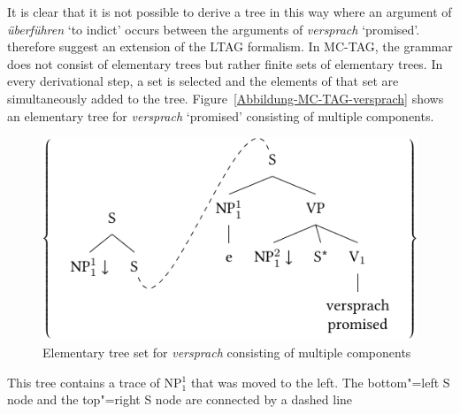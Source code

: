 \largerpage
It is clear that it is not possible to derive a tree in this way where an argument of \emph{überführen} `to indict' occurs between the arguments of \emph{versprach}
`promised'. \citet*{JBR2000a} therefore suggest an extension of the LTAG formalism. In MC-TAG, the grammar does not consist of elementary trees but rather
finite sets of elementary trees. In every derivational step, a set is selected and the elements of that set are simultaneously added to the tree.
Figure~\vref{Abbildung-MC-TAG-versprach} shows an elementary tree for \emph{versprach} `promised' consisting of multiple components.
\begin{figure}
\includegraphics{Figures/tag-versprach-lsp-crop}
\caption{\label{Abbildung-MC-TAG-versprach}Elementary tree set for \emph{versprach} consisting of multiple components}
\end{figure}%
This tree contains a trace of NP$_1^1$ that was moved to the left. The bottom"=left S node and the top"=right S node are connected by a dashed line
